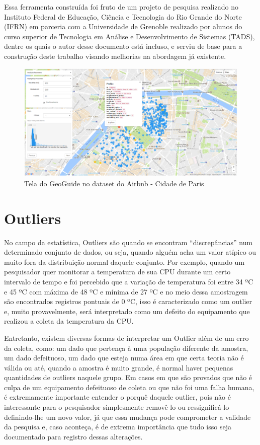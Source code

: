 Essa ferramenta construída foi fruto de um projeto de pesquisa realizado no Instituto Federal de Educação, Ciência e Tecnologia do Rio Grande do Norte (IFRN) em parceria com a Universidade de Grenoble realizado por alunos do curso superior de Tecnologia em Análise e Desenvolvimento de Sistemas (TADS), dentre os quais o autor desse documento está incluso, e serviu de base para a construção deste trabalho visando melhorias na abordagem já existente.

\begin{figure}[t]
	\centering
	\includegraphics[width=\textwidth]{images/geoguide-example-airbnb}
	\caption{Tela do GeoGuide no dataset do Airbnb - Cidade de Paris}
	\label{fig:geoguide-example-airbnb}
	\vspace{-10pt}
\end{figure}

\section{Outliers}

No campo da estatística, Outliers são quando se encontram ``discrepâncias'' num determinado conjunto de dados, ou seja, quando alguém acha um valor atípico ou muito fora da distribuição normal daquele conjunto. Por exemplo, quando um pesquisador quer monitorar a temperatura de sua CPU durante um certo intervalo de tempo e foi percebido que a variação de temperatura foi entre 34 ºC e 45 ºC com máxima de 48 ºC e mínima de 27 ºC e no meio dessa amostragem são encontrados registros pontuais de 0 ºC, isso é caracterizado como um outlier e, muito provavelmente, será interpretado como um defeito do equipamento que realizou a coleta da temperatura da CPU.

Entretanto, existem diversas formas de interpretar um Outlier além de um erro da coleta, como: um dado que pertença à uma população diferente da amostra, um dado defeituoso, um dado que esteja numa área em que certa teoria não é válida ou até, quando a amostra é muito grande, é normal haver pequenas quantidades de outliers naquele grupo. Em casos em que são provados que não é culpa de um equipamento defeituoso de coleta ou que não foi uma falha humana, é extremamente importante entender o porquê daquele outlier, pois não é interessante para o pesquisador simplesmente removê-lo ou ressignificá-lo definindo-lhe um novo valor, já que essa mudança pode comprometer a validade da pesquisa e, caso aconteça, é de extrema importância que tudo isso seja documentado para registro dessas alterações.

